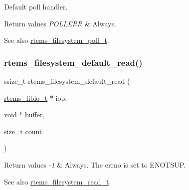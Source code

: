Default poll handler. 


\begin{DoxyRetVals}{Return values}
{\em P\+O\+L\+L\+E\+RR} & Always.\\
\hline
\end{DoxyRetVals}
\begin{DoxySeeAlso}{See also}
\mbox{\hyperlink{group__LibIOFSHandler_ga0e8056cf6051bb275005b03e74d0ff5d}{rtems\+\_\+filesystem\+\_\+poll\+\_\+t}}. 
\end{DoxySeeAlso}
\mbox{\label{group__LibIOFSHandler_gad453e9f1320d2c20ac2966e327e9c351}} 
\subsubsection{\texorpdfstring{rtems\_filesystem\_default\_read()}{rtems\_filesystem\_default\_read()}}
{\footnotesize\ttfamily ssize\+\_\+t rtems\+\_\+filesystem\+\_\+default\+\_\+read (\begin{DoxyParamCaption}\item[{\mbox{\hyperlink{structrtems__libio__tt}{rtems\+\_\+libio\+\_\+t}} $\ast$}]{iop,  }\item[{void $\ast$}]{buffer,  }\item[{size\+\_\+t}]{count }\end{DoxyParamCaption})}


\begin{DoxyRetVals}{Return values}
{\em -\/1} & Always. The errno is set to E\+N\+O\+T\+S\+UP.\\
\hline
\end{DoxyRetVals}
\begin{DoxySeeAlso}{See also}
\mbox{\hyperlink{group__LibIOFSHandler_ga36ed9dda6132dd307fc24ce03f730312}{rtems\+\_\+filesystem\+\_\+read\+\_\+t}}. 
\end{DoxySeeAlso}
\mbox{\label{group__LibIOFSHandler_ga9e051f16ae657b119d54bffc29baffeb}} 

